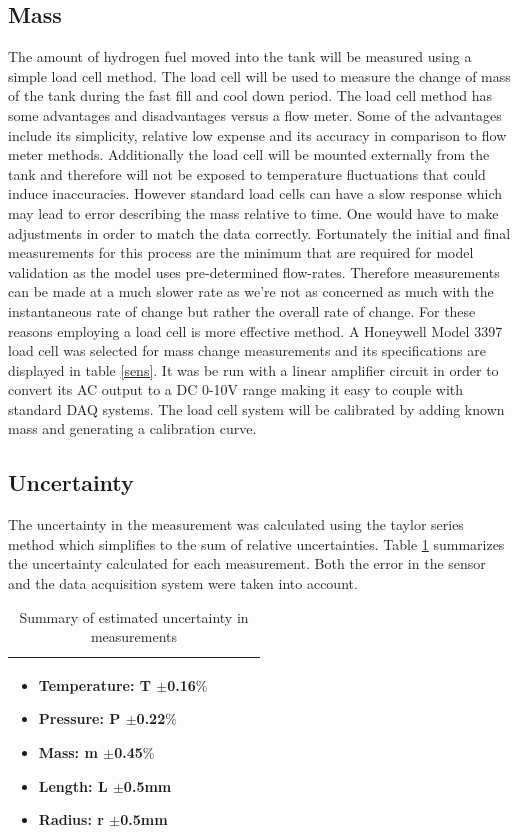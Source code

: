 \documentclass[paper=a4, fontsize=11pt, abstract=on]{scrartcl}
\numberwithin{equation}{section}		%
\numberwithin{figure}{section}			%
\numberwithin{table}{section}				%
\begin{document}
\subsection{Mass}
The amount of hydrogen fuel moved into the tank will be measured using a simple load cell method. The load cell will be used to measure the change of mass of the tank during the fast fill and cool down period. The load cell method has some advantages and disadvantages versus a flow meter. Some of the advantages include its simplicity, relative low expense and its accuracy in comparison to flow meter methods. Additionally the load cell will be mounted externally from the tank and therefore will not be exposed to temperature fluctuations that could induce inaccuracies. However standard load cells can have a slow response which may lead to error describing the mass relative to time. One would have to make adjustments in order to match the data correctly. Fortunately the initial and final measurements for this process are the minimum that are required for model validation as the model uses pre-determined flow-rates.  Therefore measurements can be made at a much slower rate as we're not as concerned as much with the instantaneous rate of change but rather the overall rate of change. For these reasons employing a load cell is more effective method. A Honeywell Model 3397 load cell was selected for mass change measurements and its specifications are displayed in table \ref{sens}. It was be run with a linear amplifier circuit in order to convert its AC output to a DC 0-10V range making it easy to couple with standard DAQ systems. The load cell system will be calibrated by adding known mass and generating a calibration curve.
\subsection{Uncertainty}

The uncertainty in the measurement was calculated using the taylor series method which simplifies to the sum of relative uncertainties. Table \ref{un} summarizes the uncertainty calculated for each measurement. Both the error in the sensor and the data acquisition system were taken into account.


\begin{table}[H]
\begin{center}
    \begin{tabular}{ | p{0.5\linewidth} |}
 \hline  
    \begin{itemize}
      \item Temperature: T $\pm$0.16$\%$
      \item Pressure: P $\pm$0.22$\%$
      \item Mass: m $\pm$0.45$\%$
      \item Length: L $\pm$0.5mm
       \item Radius: r $\pm$0.5mm
      \end{itemize}
    \\ \hline  
    \end{tabular}
\end{center} 
\caption{Summary of estimated uncertainty in measurements}
\label{un} 
\end{table}
\end{document}
